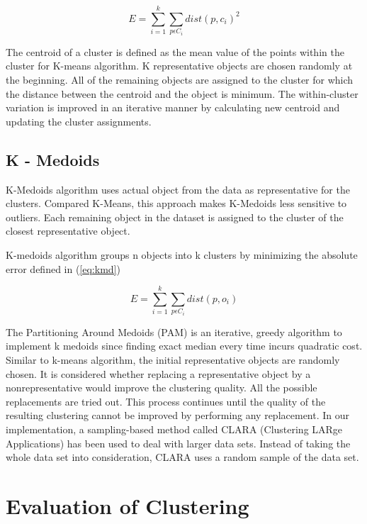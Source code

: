 \documentclass[12pt]{article}
\begin{document}
\begin{equation}
\label{eq:kmean}
E = \sum_{i=1}^{k} \sum_{p \epsilon C_i} dist(p,c_i)^2
\end{equation}

The centroid of a cluster is defined as the mean value of the points within the cluster for K-means algorithm. K representative objects are chosen randomly at the beginning. All of the remaining objects are assigned to the cluster for which the distance between the centroid and the object is minimum. The within-cluster variation is improved in an iterative manner by calculating new centroid and updating the cluster assignments.


\subsection{K - Medoids}
K-Medoids algorithm uses actual object from the data as representative for the clusters. Compared K-Means, this approach makes K-Medoids less sensitive to outliers. Each remaining object in the dataset is assigned to the cluster of the closest representative object.

K-medoids algorithm groups n objects into k clusters by minimizing the absolute error defined in (\ref{eq:kmd})

\begin{equation}
\label{eq:kmd}
 E = \sum_{i=1}^{k} \sum_{p \epsilon C_i} dist(p,o_i)
\end{equation}

The Partitioning Around Medoids (PAM) is an iterative, greedy
algorithm to implement k medoids since finding exact median every time incurs quadratic cost. Similar to k-means algorithm, the initial representative objects are randomly
chosen. It is considered whether replacing a representative object by a nonrepresentative
 would improve the clustering quality. All the possible replacements
are tried out. This process continues until the quality of the resulting clustering cannot be improved by performing any replacement. In our implementation,  a sampling-based method called CLARA (Clustering LARge Applications) has been used to deal with larger data sets. Instead of taking the whole data set into consideration, CLARA uses a random sample of the data set.

\section{Evaluation of Clustering}
\end{document}
